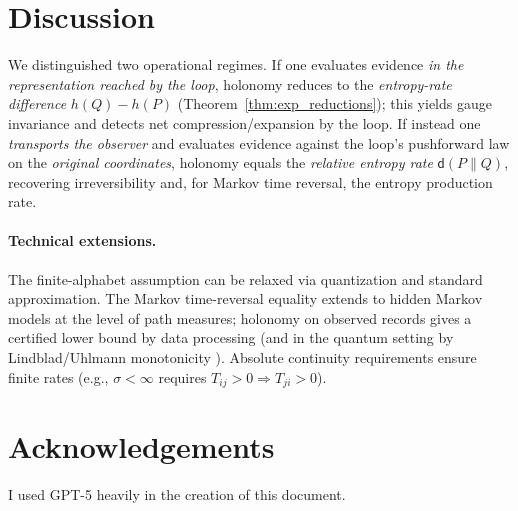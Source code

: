 \documentclass[11pt]{article}
\newcommand{\1}{\mathbbm{1}}
\begin{document}
\section*{Discussion}
We distinguished two operational regimes. If one evaluates evidence \emph{in the representation reached by the loop}, holonomy reduces to the \emph{entropy-rate difference} $h(Q)-h(P)$ (Theorem~\ref{thm:exp_reductions}); this yields gauge invariance and detects net compression/expansion by the loop. If instead one \emph{transports the observer} and evaluates evidence against the loop's pushforward law on the \emph{original coordinates}, holonomy equals the \emph{relative entropy rate} $\mathsf{d}(P\|Q)$, recovering irreversibility and, for Markov time reversal, the entropy production rate.

\paragraph{Technical extensions.} The finite-alphabet assumption can be relaxed via quantization and standard approximation. The Markov time-reversal equality extends to hidden Markov models at the level of path measures; holonomy on observed records gives a certified lower bound by data processing (and in the quantum setting by Lindblad/Uhlmann monotonicity \cite{lindblad1975,uhlmann1977}). Absolute continuity requirements ensure finite rates (e.g., $\sigma<\infty$ requires $T_{ij}>0 \Rightarrow T_{ji}>0$).

\section*{Acknowledgements}
I used GPT-5 heavily in the creation of this document.
\end{document}
